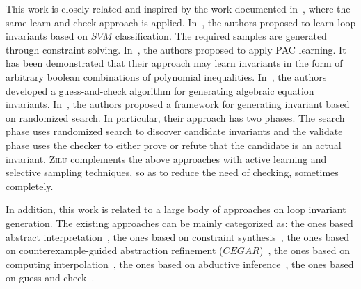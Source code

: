 This work is closely related and inspired by the work documented in~\cite{sharma2012interpolants,sharma2013verification,DBLP:conf/esop/0001GHALN13,sharma2014invariant}, where the same learn-and-check approach is applied. 
In~\cite{sharma2012interpolants}, the authors proposed to learn loop invariants based on $\mathit{SVM}$ classification. 
The required samples are generated through constraint solving. In~\cite{sharma2013verification}, the authors proposed to apply PAC learning. 
It has been demonstrated that their approach may learn invariants in the form of arbitrary boolean
combinations of polynomial inequalities. In~\cite{DBLP:conf/esop/0001GHALN13}, the authors developed a guess-and-check algorithm for generating algebraic equation invariants. 
In~\cite{sharma2014invariant}, the authors proposed a framework for generating invariant based on randomized search. 
In particular, their approach has two phases. 
The search phase uses randomized search to discover candidate invariants and the validate phase uses the checker to either prove or refute that the candidate is an actual invariant. 
\textsc{Zilu} complements the above approaches with active learning and selective sampling techniques, so as to reduce the need of checking, sometimes completely.

In addition, this work is related to a large body of approaches on loop invariant generation. The existing approaches can be mainly categorized as:
the ones based abstract interpretation~\cite{cousot1978automatic,mine2006octagon,cousot1979systematic,karr1976affine,vincent2009subpolyhedra}, 
the ones based on constraint synthesis~\cite{ashutosh2009invgen,michael2003linear,sumit2009constraint}, 
the ones based on counterexample-guided abstraction refinement ($\mathit{CEGAR}$)~\cite{henzinger2003software,thomas2001slam,edmund2003counterexample}, 
the ones based on computing interpolation~\cite{kenneth2010lazy,thomas2004abstractions,kenneth2003interpolation,Kenneth2006lazy}, 
the ones based on abductive inference~\cite{isil2013inductive}, 
the ones based on guess-and-check~\cite{cormac2001houdini,ernst2007daikon}.

